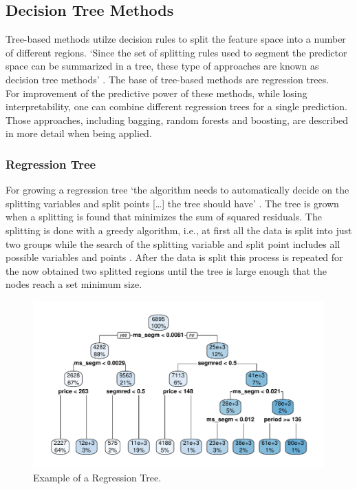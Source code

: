\documentclass[11pt,]{article}
\begin{document}
\hypertarget{decision-tree-methods}{%
\subsection{Decision Tree Methods}\label{decision-tree-methods}}

Tree-based methods utilze decision rules to split the feature space into
a number of different regions. `Since the set of splitting rules used to
segment the predictor space can be summarized in a tree, these type of
approaches are known as decision tree methods'
\autocite[][p. 303]{Hastie2013}. The base of tree-based methods are
regression trees.\\
For improvement of the predictive power of these methods, while losing
interpretability, one can combine different regression trees for a
single prediction. Those approaches, including bagging, random forests
and boosting, are described in more detail when being applied.

\hypertarget{regression-tree}{%
\subsubsection{Regression Tree}\label{regression-tree}}

For growing a regression tree `the algorithm needs to automatically
decide on the splitting variables and split points {[}\ldots{}{]} the
tree should have' \autocite[][p. 349]{Hastie2013}. The tree is grown
when a splitting is found that minimizes the sum of squared residuals.
The splitting is done with a greedy algorithm, i.e., at first all the
data is split into just two groups while the search of the splitting
variable and split point includes all possible variables and points
\autocite[cf.][p. 349]{Hastie2013}. After the data is split this process
is repeated for the now obtained two splitted regions until the tree is
large enough that the nodes reach a set minimum size.

\begin{figure}
\centering
\includegraphics{../00_data/output_paper/09_tree.pdf}
\caption{\label{fig:tree}Example of a Regression Tree.}
\end{figure}
\end{document}
